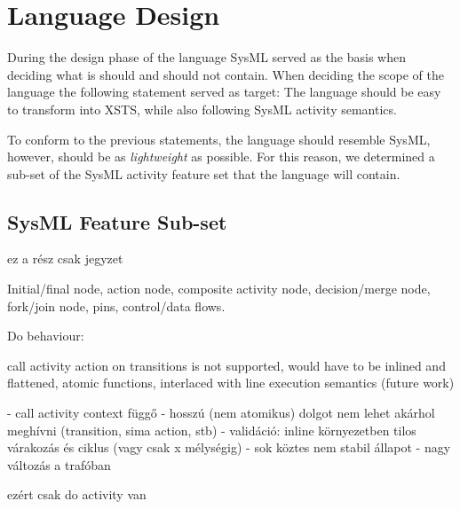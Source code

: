 \section{Language Design}

During the design phase of the language SysML served as the basis when deciding what is should and should not contain. When deciding the scope of the language the following statement served as target: The language should be easy to transform into XSTS, while also following SysML activity semantics.

To conform to the previous statements, the language should resemble SysML, however, should be as \emph{lightweight} as possible. For this reason, we determined a sub-set of the SysML activity feature set that the language will contain.

\subsection{SysML Feature Sub-set}

ez a rész csak jegyzet

Initial/final node, action node, composite activity node, decision/merge node, fork/join node, pins, control/data flows.

Do behaviour: 

call activity action on transitions is not supported, would have to be inlined and flattened, atomic functions, interlaced with line execution semantics (future work)

 - call activity context függő - hosszú (nem atomikus) dolgot nem lehet akárhol meghívni (transition, sima action, stb)
- validáció: inline környezetben tilos várakozás és ciklus (vagy csak x mélységig)
- sok köztes nem stabil állapot
- nagy változás a trafóban

ezért csak do activity van